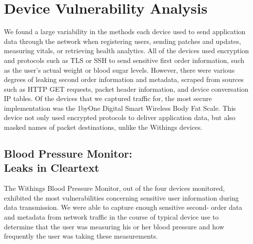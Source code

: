 
\section{Device Vulnerability Analysis}

We found a large variability in the methods each device used to send
application data through the network when registering users, sending patches
and updates, measuring vitals, or retrieving health analytics. All of the
devices used encryption and protocols such as TLS or SSH to send sensitive
first order information, such as the user's actual weight or blood sugar
levels. However, there were various degrees of leaking second order
information and metadata, scraped from sources such as HTTP GET requests,
packet header information, and device conversation IP tables. Of the devices
that we captured traffic for, the most secure implementation was the 1byOne
Digital Smart Wireless Body Fat Scale. This device not only used encrypted
protocols to deliver application data, but also masked names of packet
destinations, unlike the Withings devices.

\subsection{Blood Pressure Monitor: \\ Leaks in Cleartext}

The Withings Blood Pressure Monitor, out of the four devices monitored,
exhibited the most vulnerabilities concerning sensitive user information
during data transmission. We were able to capture enough sensitive second-
order data and metadata from network traffic in the course
of typical device use to determine that the user was measuring his or
her blood pressure and how frequently the user was taking these measurements.

